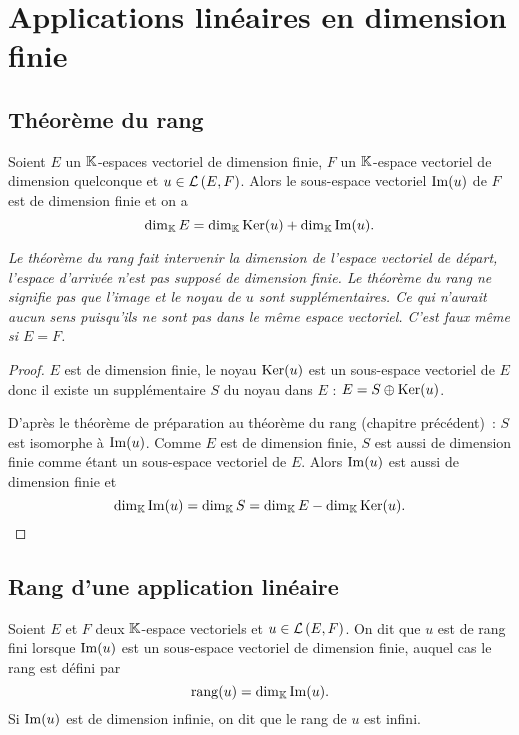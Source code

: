 \section{Applications linéaires en dimension finie}

\subsection{Théorème du rang}

\begin{theo}
  Soient \(E\) un \(\mathbb{K}\)-espaces vectoriel de dimension finie, \(F\) un \(\mathbb{K}\)-espace vectoriel de dimension quelconque et \(u \in \mathcal{L}\left(E,F\right)\). Alors le sous-espace vectoriel \(\operatorname{Im}(u)\) de \(F\) est de dimension finie et on a
  \begin{equation}
    \operatorname{dim}_{\mathbb{K}} E = \operatorname{dim}_{\mathbb{K}} \operatorname{Ker}(u) + \operatorname{dim}_{\mathbb{K}} \operatorname{Im}(u).
  \end{equation}
\end{theo}

\emph{Le théorème du rang fait intervenir la dimension de l'espace vectoriel de départ, l'espace d'arrivée n'est pas supposé de dimension finie. Le théorème du rang ne signifie pas que l'image et le noyau de \(u\) sont supplémentaires. Ce qui n'aurait aucun sens puisqu'ils ne sont pas dans le même espace vectoriel. C'est faux même si \(E=F\).}
\begin{proof}
  \(E\) est de dimension finie, le noyau \(\operatorname{Ker}(u)\) est un sous-espace vectoriel de \(E\) donc il existe un supplémentaire \(S\) du noyau dans \(E\) : \(E= S \oplus \operatorname{Ker}(u)\).
  
  D'après le théorème de préparation au théorème du rang (chapitre précédent)~: \(S\) est isomorphe à \(\operatorname{Im}(u)\). Comme \(E\) est de dimension finie, \(S\) est aussi de dimension finie comme étant un sous-espace vectoriel de \(E\). Alors \(\operatorname{Im}(u)\) est aussi de dimension finie et 
  \begin{equation}
    \operatorname{dim}_{\mathbb{K}} \operatorname{Im}(u) = \operatorname{dim}_{\mathbb{K}} S = \operatorname{dim}_{\mathbb{K}} E - \operatorname{dim}_{\mathbb{K}} \operatorname{Ker}(u).
  \end{equation}
\end{proof}

\subsection{Rang d'une application linéaire}

\begin{defdef}
  Soient \(E\) et \(F\) deux \(\mathbb{K}\)-espace vectoriels et \(u \in \mathcal{L}\left(E,F\right)\). On dit que \(u\) est de rang fini lorsque \(\operatorname{Im}(u)\) est un sous-espace vectoriel de dimension finie, auquel cas le rang est défini par
  \begin{equation}
    \operatorname{rang}(u) = \operatorname{dim}_{\mathbb{K}} \operatorname{Im}(u).
  \end{equation}
  Si \(\operatorname{Im}(u)\) est de dimension infinie, on dit que le rang de \(u\) est infini.
\end{defdef}

